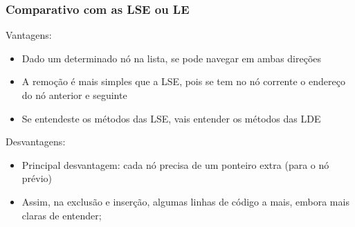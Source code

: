 \begin{frame}
\frametitle{Comparativo com as LSE ou LE}

\begin{block}{Vantagens:}
\begin{itemize}
  \item Dado um determinado nó na lista, se pode navegar em ambas direções
  \item A remoção é mais simples que a LSE, pois se tem no nó corrente
  o endereço do nó anterior e seguinte
  \item Se entendeste os métodos das LSE, vais entender os métodos das LDE
\end{itemize}
\end{block}

\begin{block}{Desvantagens:}
\begin{itemize}
  \item Principal desvantagem: cada nó precisa de um ponteiro extra (para o nó prévio)
  \item Assim, na exclusão e inserção, algumas linhas de código a mais,
  embora mais claras de entender;

\end{itemize}
\end{block}
\end{frame} 

